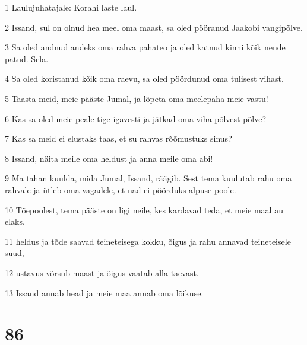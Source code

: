 \par 1 Laulujuhatajale: Korahi laste laul.
\par 2 Issand, sul on olnud hea meel oma maast, sa oled pööranud Jaakobi vangipõlve.
\par 3 Sa oled andnud andeks oma rahva pahateo ja oled katnud kinni kõik nende patud. Sela.
\par 4 Sa oled koristanud kõik oma raevu, sa oled pöördunud oma tulisest vihast.
\par 5 Taasta meid, meie pääste Jumal, ja lõpeta oma meelepaha meie vastu!
\par 6 Kas sa oled meie peale tige igavesti ja jätkad oma viha põlvest põlve?
\par 7 Kas sa meid ei elustaks taas, et su rahvas rõõmustuks sinus?
\par 8 Issand, näita meile oma heldust ja anna meile oma abi!
\par 9 Ma tahan kuulda, mida Jumal, Issand, räägib. Sest tema kuulutab rahu oma rahvale ja ütleb oma vagadele, et nad ei pöörduks alpuse poole.
\par 10 Tõepoolest, tema pääste on ligi neile, kes kardavad teda, et meie maal au elaks,
\par 11 heldus ja tõde saavad teineteisega kokku, õigus ja rahu annavad teineteisele suud,
\par 12 ustavus võrsub maast ja õigus vaatab alla taevast.
\par 13 Issand annab head ja meie maa annab oma lõikuse.

\chapter{86}

